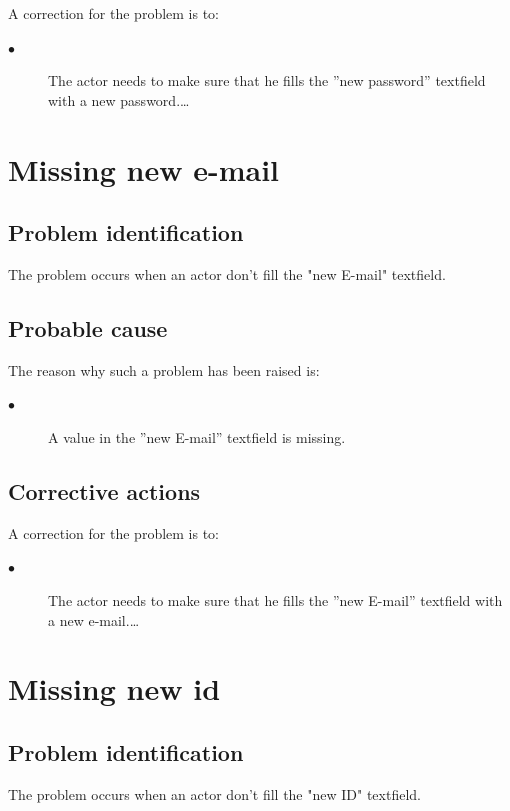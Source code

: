 A correction for the problem is to:\\
\begin{description}
\item[$\bullet$] The actor needs to make sure that he fills the
''new password'' textfield with a new password.\ldots

\end{description}




\section{Missing new e-mail} 

\subsection{Problem identification}
The problem occurs when an actor don't fill the "new E-mail" textfield.

\subsection{Probable cause}

The reason why such a problem has been raised is:\\
\begin{description}
\item[$\bullet$] A value in the ''new E-mail'' textfield is missing.
\end{description}


\subsection{Corrective actions}

A correction for the problem is to:\\
\begin{description}
\item[$\bullet$] The actor needs to make sure that he fills the
''new E-mail'' textfield with a new e-mail.\ldots

\end{description}




\section{Missing new id} 

\subsection{Problem identification}
The problem occurs when an actor don't fill the "new ID" textfield.


